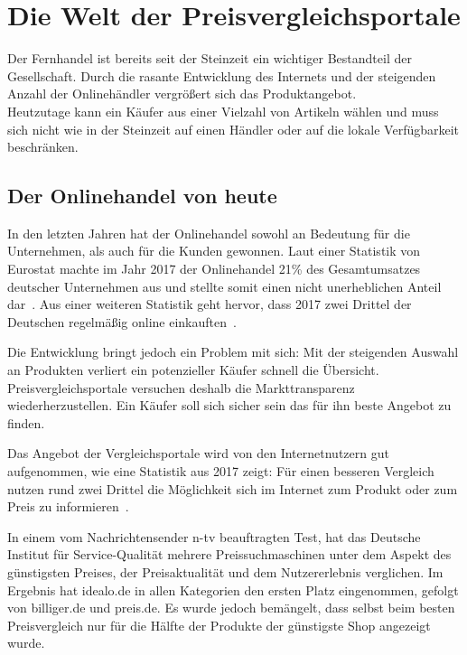 \section{Die Welt der Preisvergleichsportale}
\label{sec:einleitung}

Der Fernhandel ist bereits seit der Steinzeit ein wichtiger Bestandteil der Gesellschaft.
Durch die rasante Entwicklung des Internets und der steigenden Anzahl der Onlinehändler vergrößert sich das
Produktangebot.\\
Heutzutage kann ein Käufer aus einer Vielzahl von Artikeln wählen und muss sich nicht wie in der Steinzeit auf
einen Händler oder auf die lokale Verfügbarkeit beschränken.

\subsection{Der Onlinehandel von heute}
\label{subsec:onlinehandel-heute}

In den letzten Jahren hat der Onlinehandel sowohl an Bedeutung für die Unternehmen, als auch für die Kunden gewonnen.
Laut einer Statistik von Eurostat machte im Jahr 2017 der Onlinehandel 21\% des Gesamtumsatzes deutscher Unternehmen
aus und stellte somit einen nicht unerheblichen Anteil dar~\cite{statista:anteil-gesamtumsatz-europa}.
Aus einer weiteren Statistik geht hervor, dass 2017 zwei Drittel der Deutschen regelmäßig online
einkauften~\cite{statista:anteil-online-kaeufer-europa}.

Die Entwicklung bringt jedoch ein Problem mit sich: Mit der steigenden Auswahl an Produkten verliert ein
potenzieller Käufer schnell die Übersicht.
Preisvergleichsportale versuchen deshalb die Markttransparenz wiederherzustellen.
Ein Käufer soll sich sicher sein das für ihn beste Angebot zu finden.

Das Angebot der Vergleichsportale wird von den Internetnutzern gut aufgenommen, wie eine Statistik aus 2017 zeigt:
Für einen besseren Vergleich nutzen rund zwei Drittel die Möglichkeit sich im Internet zum Produkt oder zum
Preis zu informieren~\cite{statista:internetnutzer-preisvergleich-deutschland,
statista:anteil-online-kaeufe-deutschland}.

In einem vom Nachrichtensender n-tv beauftragten Test\footnotemark, hat das Deutsche Institut für Service-Qualität
mehrere Preissuchmaschinen unter dem Aspekt des günstigsten Preises, der Preisaktualität und dem Nutzererlebnis
verglichen.
\newline
Im Ergebnis hat idealo.de in allen Kategorien den ersten Platz eingenommen, gefolgt von billiger.de und preis.de.
Es wurde jedoch bemängelt, dass selbst beim besten Preisvergleich nur für die Hälfte der Produkte der günstigste
Shop angezeigt wurde.

